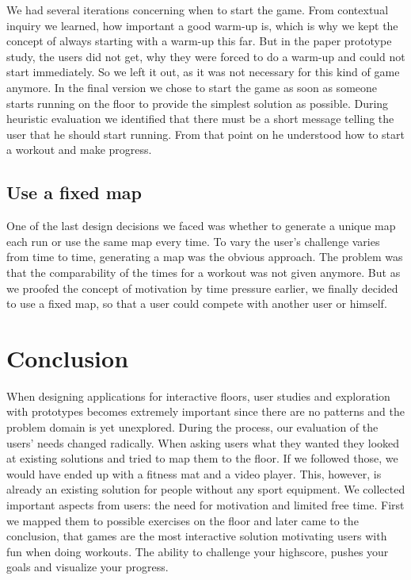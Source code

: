\documentclass{sigchi}
\begin{document}
    We had several iterations concerning when to start the game. From contextual inquiry we learned, how important a good warm-up is, which is why we kept the concept of always starting with a warm-up this far. But in the paper prototype study, the users did not get, why they were forced to do a warm-up and could not start immediately. So we left it out, as it was not necessary for this kind of game anymore. In the final version we chose to start the game as soon as someone starts running on the floor to provide the simplest solution as possible. During heuristic evaluation we identified that there must be a short message telling the user that he should start running. From that point on he understood how to start a workout and make progress.

  \subsection{Use a fixed map} %
  \label{sub:use_a_fixed_map}

    One of the last design decisions we faced was whether to generate a unique map each run or use the same map every time. To vary the user's challenge varies from time to time, generating a map was the obvious approach. The problem was that the comparability of the times for a workout was not given anymore. But as we proofed the concept of motivation by time pressure earlier, we finally decided to use a fixed map, so that a user could compete with another user or himself.

\section{Conclusion}

  When designing applications for interactive floors, user studies and exploration with prototypes becomes extremely important since there are no patterns and the problem domain is yet unexplored. During the process, our evaluation of the users' needs changed radically. When asking users what they wanted they looked at existing solutions and tried to map them to the floor. If we followed those, we would have ended up with a fitness mat and a video player. This, however, is already an existing solution for people without any sport equipment. We collected important aspects from users: the need for motivation and limited free time. First we mapped them to possible exercises on the floor and later came to the conclusion, that games are the most interactive solution motivating users with fun when doing workouts. The ability to challenge your highscore, pushes your goals and visualize your progress. 
\end{document}
